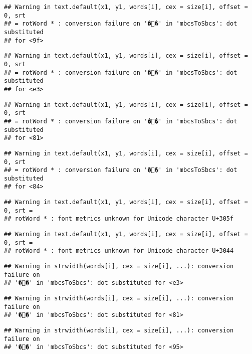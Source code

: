 \documentclass[]{article}
\begin{document}
\begin{verbatim}
## Warning in text.default(x1, y1, words[i], cex = size[i], offset = 0, srt
## = rotWord * : conversion failure on '��' in 'mbcsToSbcs': dot substituted
## for <9f>
\end{verbatim}

\begin{verbatim}
## Warning in text.default(x1, y1, words[i], cex = size[i], offset = 0, srt
## = rotWord * : conversion failure on '��' in 'mbcsToSbcs': dot substituted
## for <e3>
\end{verbatim}

\begin{verbatim}
## Warning in text.default(x1, y1, words[i], cex = size[i], offset = 0, srt
## = rotWord * : conversion failure on '��' in 'mbcsToSbcs': dot substituted
## for <81>
\end{verbatim}

\begin{verbatim}
## Warning in text.default(x1, y1, words[i], cex = size[i], offset = 0, srt
## = rotWord * : conversion failure on '��' in 'mbcsToSbcs': dot substituted
## for <84>
\end{verbatim}

\begin{verbatim}
## Warning in text.default(x1, y1, words[i], cex = size[i], offset = 0, srt =
## rotWord * : font metrics unknown for Unicode character U+305f
\end{verbatim}

\begin{verbatim}
## Warning in text.default(x1, y1, words[i], cex = size[i], offset = 0, srt =
## rotWord * : font metrics unknown for Unicode character U+3044
\end{verbatim}

\begin{verbatim}
## Warning in strwidth(words[i], cex = size[i], ...): conversion failure on
## '��' in 'mbcsToSbcs': dot substituted for <e3>
\end{verbatim}

\begin{verbatim}
## Warning in strwidth(words[i], cex = size[i], ...): conversion failure on
## '��' in 'mbcsToSbcs': dot substituted for <81>
\end{verbatim}

\begin{verbatim}
## Warning in strwidth(words[i], cex = size[i], ...): conversion failure on
## '��' in 'mbcsToSbcs': dot substituted for <95>
\end{verbatim}
\end{document}

